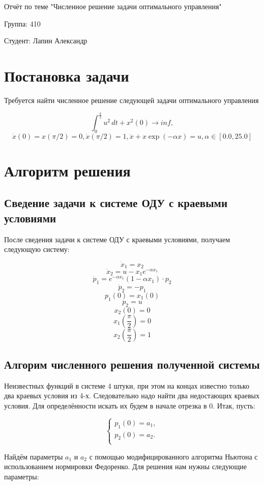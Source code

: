 \documentclass [a4paper, 12pt] {article}
\begin{document}
\begin {center}
Отчёт по теме "Численное решение задачи оптимального управления"
\end {center}

Группа: 410

Студент: Лапин Александр

\section {Постановка задачи}

Требуется найти численное решение следующей задачи оптимального управления

$$\int_0^{\frac{\pi}{2}} u^2 \, dt + x^2 (0) \rightarrow inf,$$
$$\dot x(0) = x(\pi / 2) = 0, \dot x(\pi / 2) = 1, \ddot x + x \exp (- \alpha x) = u, \alpha \in [0.0, 25.0]$$
\section {Алгоритм решения}

\subsection {Сведение задачи к системе ОДУ с краевыми условиями}

После сведения задачи к системе ОДУ с краевыми условиями, получаем следующую систему:

$$
\dot x_1 = x_2
$$
$$
\dot x_2 = u - x_1 e^{- \alpha x_1}
$$
$$
\dot p_1 = e^{- \alpha x_1} (1 - \alpha x_1) \cdot p_2
$$
$$
\dot p_2 = - p_1
$$
$$
p_1(0) = x_1(0)
$$
$$
p_2 = u
$$
$$
x_2 (0) = 0
$$
$$
x_1(\frac{\pi}{2}) = 0
$$
$$
x_2(\frac{\pi}{2}) = 1
$$

\subsection {Алгорим численного решения полученной системы}
Неизвестных функций в системе 4 штуки, при этом на концах известно только два краевых условия из 4-х. Следовательно надо найти два недостающих краевых условия. Для определённости искать их будем в начале отрезка в 0. Итак, пусть:

$$
\left
\{ 
\begin {array} {ll}
p_1(0) = a_1, \\
p_2(0) = a_2. \\
\end {array}
\right .
$$

Найдём параметры $a_1$ и $a_2$ с помощью модифицированного алгоритма Ньютона с использованием нормировки Федоренко. Для решения нам нужны следующие параметры:
\end{document}
